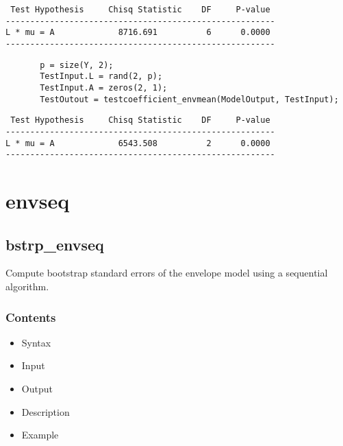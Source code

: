 \documentclass[a4paper,11pt,openany]{memoir}
\begin{document}
        \color{lightgray} \ttfamily\begin{verbatim}
 Test Hypothesis     Chisq Statistic    DF     P-value
-------------------------------------------------------
L * mu = A             8716.691          6      0.0000
-------------------------------------------------------
\end{verbatim} \rmfamily
\color{black}
       
\begin{verbatim}       p = size(Y, 2);
       TestInput.L = rand(2, p);
       TestInput.A = zeros(2, 1);
       TestOutout = testcoefficient_envmean(ModelOutput, TestInput);\end{verbatim}


        \color{lightgray} \ttfamily\begin{verbatim}
 Test Hypothesis     Chisq Statistic    DF     P-value
-------------------------------------------------------
L * mu = A             6543.508          2      0.0000
-------------------------------------------------------
\end{verbatim} \rmfamily
\color{black}
    
    \newpage

\chapter{envseq}
\rmfamily
\color{black}\section{bstrp\_envseq}

\begin{par}
Compute bootstrap standard errors of the envelope model using a sequential algorithm.
\end{par} \vspace{1em}

\subsection*{Contents}

\begin{itemize}
\setlength{\itemsep}{-1ex}
   \item Syntax
   \item Input
   \item Output
   \item Description
   \item Example
\end{itemize}
\end{document}
